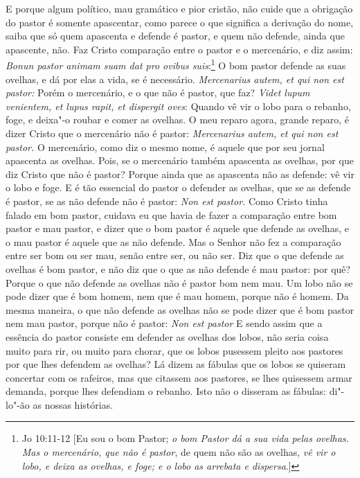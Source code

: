 E porque algum político, mau gramático e pior cristão, não cuide que a
obrigação do pastor é somente apascentar, como parece o que significa a
derivação do nome, saiba que só quem apascenta e defende é pastor, e
quem não defende, ainda que apascente, não. Faz Cristo comparação entre
o pastor e o mercenário, e diz assim: \emph{Bonun pastor animam suam dat
pro ovibus suis}:\footnote{Jo 10:11-12 [Eu sou o bom Pastor; \emph{o bom Pastor dá a sua vida pelas ovelhas. Mas o mercenário, que não é pastor}, de quem não são as ovelhas, \emph{vê vir o lobo, e deixa as ovelhas, e foge; e o lobo as arrebata e dispersa}.]} O bom pastor defende as suas ovelhas, e
dá por elas a vida, se é necessário. \emph{Mercenarius autem, et qui non
est pastor:} Porém o mercenário, e o que não é pastor, que faz?
\emph{Videt lupum venientem, et lupus rapit, et dispergit oves}: %
Quando vê vir o lobo para o rebanho, foge, e deixa"-o roubar e comer
as ovelhas. O meu reparo agora, grande reparo, é dizer Cristo que o
mercenário não é pastor: \emph{Mercenarius autem, et qui non est pastor.} O mercenário, como diz o mesmo nome, é aquele que por seu jornal
apascenta as ovelhas. Pois, se o mercenário também apascenta as ovelhas,
por que diz Cristo que não é pastor? Porque ainda que as apascenta não
as defende: vê vir o lobo e foge. E é tão essencial do pastor o defender
as ovelhas, que se as defende é pastor, se as não defende não é pastor:
\emph{Non est pastor.} Como Cristo tinha falado em bom pastor, cuidava
eu que havia de fazer a comparação entre bom pastor e mau pastor, e
dizer que o bom pastor é aquele que defende as ovelhas, e o mau pastor é
aquele que as não defende. Mas o Senhor não fez a comparação entre ser
bom ou ser mau, senão entre ser, ou não ser. Diz que o que defende as
ovelhas é bom pastor, e não diz que o que as não defende é mau pastor:
por quê? Porque o que não defende as ovelhas não é pastor bom nem mau.
Um lobo não se pode dizer que é bom homem, nem que é mau homem, porque
não é homem. Da mesma maneira, o que não defende as ovelhas não se pode
dizer que é bom pastor nem mau pastor, porque não é pastor: \emph{Non
est pastor} E sendo assim que a essência do pastor consiste em defender
as ovelhas dos lobos, não seria coisa muito para rir, ou muito para
chorar, que os lobos pusessem pleito aos pastores por que lhes defendem
as ovelhas? Lá dizem as fábulas que os lobos se quiseram concertar com
os rafeiros, mas que citassem aos pastores, se lhes quisessem armar
demanda, porque lhes defendiam o rebanho. Isto não o disseram as
fábulas: di"-lo"-ão as nossas histórias.


